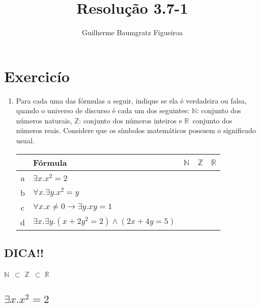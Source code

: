 \documentclass[aspectratio=43]{beamer}
\title[\sc{Resolu\c c\~ao}]{Resolu\c c\~ao 3.7-1}
\author[Guilherme Baumgratz Figueiroa]{Guilherme Baumgratz Figueiroa}
\institute[UFOP]{Universidade Federal de Ouro Preto} %
\date{}
\newcommand{\nat}{$\mathbb{N}$}
\newcommand{\inteiro}{$\mathbb{Z}$}
\newcommand{\real}{$\mathbb{R}$}
\begin{document}
	
	\begin{frame}
		\titlepage
	\end{frame}

	\section{Exercic\'io}

	\begin{frame}[fragile]
    \begin{enumerate}[1.]

		\item Para cada uma das fórmulas a seguir, indique se ela é verdadeira ou falsa, quando o universo de discurso é cada um dos seguintes: \nat : conjunto dos n\'umeros naturais, \inteiro : conjunto dos n\'umeros inteiros e \real\ conjunto dos n\'umeros reais. Considere que os símbolos matemáticos possuem o significado usual.\\
        \centering
        \vspace{20pt}
        \begin{tabular}{c|l|c|c|c|}

        	\ & F\'ormula & \nat & \inteiro & \real \\\hline
        	a & $\exists x.x^{2} = 2$ & \ & \ & \  \\
        	b & $\forall x. \exists y. x^{2} = y$ & \ & \ & \  \\
        	c & $\forall x. x \neq 0 \to \exists y.xy = 1 $ & \ & \ & \  \\
        	d & $\exists x. \exists y.(x + 2y^{2} = 2) \land (2x + 4y = 5)$ & \ & \ & \  \\
		\end{tabular}
        
	\end{enumerate}
		
	\end{frame}
    
    \subsection{DICA!!}
	
   	\begin{frame}[fragile]
    
    \centering
    \huge \nat\ $\subset$ \inteiro\ $\subset$ \real

	\end{frame}


    \subsection{$\exists x.x^{2} = 2$}
    
\end{document}
